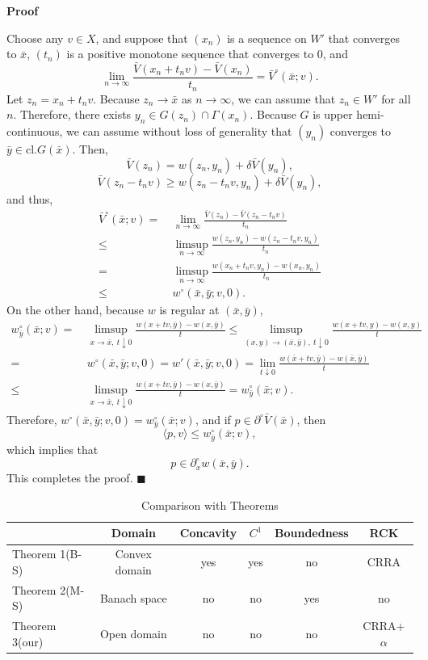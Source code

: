 \documentclass[a4paper,12pt]{article}
\makeatletter
\renewenvironment{proof}[1][\proofname]{\par
  \pushQED{\qed}%
  \normalfont \topsep6\p@\@plus6\p@\relax
  \trivlist
  \item\relax
  {\bfseries
  #1\@addpunct{.}}\hspace\labelsep\ignorespaces
}{%
  \popQED\endtrivlist\@endpefalse
}
\theoremstyle{definition}
\renewcommand{\proofname}{Proof}
\makeatother
\begin{document}
\begin{proof}
Choose any $v\in X$, and suppose that $(x_n)$ is a sequence on $W'$ that converges to $\bar{x}$, $(t_n)$ is a positive monotone sequence that converges to $0$, and
\[\lim_{n\to \infty}\frac{\bar{V}(x_n+t_nv)-\bar{V}(x_n)}{t_n}=\bar{V}^{\circ}(\bar{x};v).\]
Let $z_n=x_n+t_nv$. Because $z_n\to \bar{x}$ as $n\to \infty$, we can assume that $z_n\in W'$ for all $n$. Therefore, there exists $y_n\in G(z_n)\cap \Gamma(x_n)$. Because $G$ is upper hemi-continuous, we can assume without loss of generality that $(y_n)$ converges to $\bar{y}\in \mbox{cl.}G(\bar{x})$. Then,
\[\bar{V}(z_n)=w(z_n,y_n)+\delta\bar{V}(y_n),\]
\[\bar{V}(z_n-t_nv)\ge w(z_n-t_nv,y_n)+\delta \bar{V}(y_n),\]
and thus,
\begin{align*}
\bar{V}^{\circ}(\bar{x};v)=&~\lim_{n\to \infty}\frac{\bar{V}(z_n)-\bar{V}(z_n-t_nv)}{t_n}\\
\le&~\limsup_{n\to \infty}\frac{w(z_n,y_n)-w(z_n-t_nv,y_n)}{t_n}\\
=&~\limsup_{n\to\infty}\frac{w(x_n+t_nv,y_n)-w(x_n,y_n)}{t_n}\\
\le&~w^{\circ}(\bar{x},\bar{y};v,0).
\end{align*}
On the other hand, because $w$ is regular at $(\bar{x},\bar{y})$,
\begin{align*}
w_{\bar{y}}^{\circ}(\bar{x};v)=&~\limsup_{x\to \bar{x},\ t\downarrow 0}\frac{w(x+tv,\bar{y})-w(x,\bar{y})}{t}\le\limsup_{(x,y)\to (\bar{x},\bar{y}),\ t\downarrow 0}\frac{w(x+tv,y)-w(x,y)}{t}\\
=&~w^{\circ}(\bar{x},\bar{y};v,0)=w'(\bar{x},\bar{y};v,0)=\lim_{t\downarrow 0}\frac{w(\bar{x}+tv,\bar{y})-w(\bar{x},\bar{y})}{t}\\
\le&~\limsup_{x\to \bar{x},\ t\downarrow 0}\frac{w(x+tv,\bar{y})-w(x,\bar{y})}{t}=w_{\bar{y}}^{\circ}(\bar{x};v).
\end{align*}
Therefore, $w^{\circ}(\bar{x},\bar{y};v,0)=w_{\bar{y}}^{\circ}(\bar{x};v)$, and if $p\in \partial^{\circ}\bar{V}(\bar{x})$, then
\[\langle p,v\rangle\le w_{\bar{y}}^{\circ}(\bar{x};v),\]
which implies that
\[p\in \partial^{\circ}_xw(\bar{x},\bar{y}).\]
This completes the proof. $\blacksquare$
\end{proof}

\begin{table}[t]
\begin{tabular}{|l|c|c|c|c|c|} \hline
& Domain & Concavity & $C^1$ & Boundedness & RCK \\ \hline 
Theorem 1(B-S) & Convex domain & yes & yes & no & CRRA \\ \hline
Theorem 2(M-S) & Banach space & no & no & yes & no \\ \hline
Theorem 3(our) & Open domain & no & no & no & CRRA+$\alpha$ \\ \hline
\end{tabular}
\caption{Comparison with Theorems}
\end{table}
\end{document}
